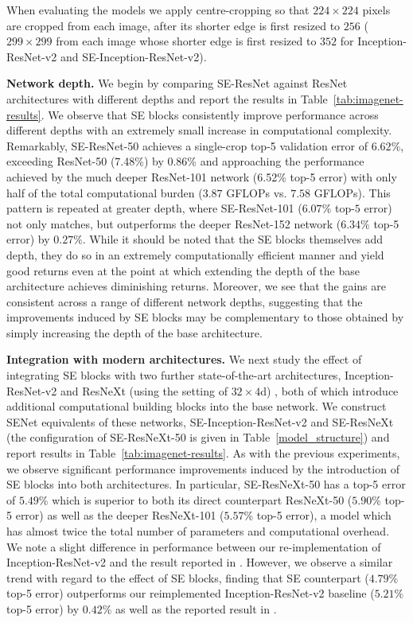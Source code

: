 When evaluating the models we apply centre-cropping so that $224\times 224$ pixels are cropped from each image, after its shorter edge is first resized to $256$ ($299\times 299$ from each image whose shorter edge is first resized to $352$ for Inception-ResNet-v2 and SE-Inception-ResNet-v2).

\vspace{5pt}
\noindent\textbf{Network depth.}
We begin by comparing SE-ResNet against ResNet architectures with different depths and report the results in Table~\ref{tab:imagenet-results}. We observe that SE blocks consistently improve performance across different depths with an extremely small increase in computational complexity.  Remarkably, SE-ResNet-50 achieves a single-crop \mbox{top-5} validation error of $6.62\%$, exceeding ResNet-50 (7.48\%) by 0.86\% and approaching the performance achieved by the much deeper ResNet-101 network (6.52\% top-5 error) with only half of the total computational burden ($3.87$ GFLOPs vs. $7.58$ GFLOPs). This pattern is repeated at greater depth, where SE-ResNet-101 ($6.07\%$ top-$5$ error) not only matches, but outperforms the deeper ResNet-152 network ($6.34\%$ top-5 error) by $0.27\%$. While it should be noted that the SE blocks themselves add depth, they do so in an extremely computationally efficient manner and yield good returns even at the point at which extending the depth of the base architecture achieves diminishing returns. Moreover, we see that the gains are consistent across a range of different network depths, suggesting that the improvements induced by SE blocks may be complementary to those obtained by simply increasing the depth of the base architecture.


\vspace{5pt}
\noindent\textbf{Integration with modern architectures.}
We next study the effect of integrating SE blocks with two further state-of-the-art architectures, Inception-ResNet-v2 \cite{szegedy_iclrw2016inceptionv4} and ResNeXt (using the setting of $32\times 4$d) \cite{xie_cvpr2017resnext}, both of which introduce additional computational building blocks into the base network.  We construct SENet equivalents of these networks, SE-Inception-ResNet-v2 and SE-ResNeXt (the configuration of SE-ResNeXt-50 is given in Table~\ref{model_structure}) and report results in  Table~\ref{tab:imagenet-results}.  As with the previous experiments, we observe significant performance improvements induced by the introduction of SE blocks into both architectures. In particular, \mbox{SE-ResNeXt-50} has a top-5 error of $5.49$\% which is superior to both its direct counterpart ResNeXt-50 ($5.90\%$ top-5 error) as well as the deeper ResNeXt-101 ($5.57\%$ top-5 error), a model which has almost twice the total number of parameters and computational overhead. We note a slight difference in performance between our re-implementation of {\mbox Inception-ResNet-v2} and the result reported in \cite{szegedy_iclrw2016inceptionv4}. However, we observe a similar trend with regard to the effect of SE blocks, finding that SE counterpart ($4.79\%$ \mbox{top-5} error) outperforms our reimplemented \mbox{Inception-ResNet-v2} baseline ($5.21\%$ top-5 error) by $0.42\%$ as well as the reported result in \cite{szegedy_iclrw2016inceptionv4}.  

